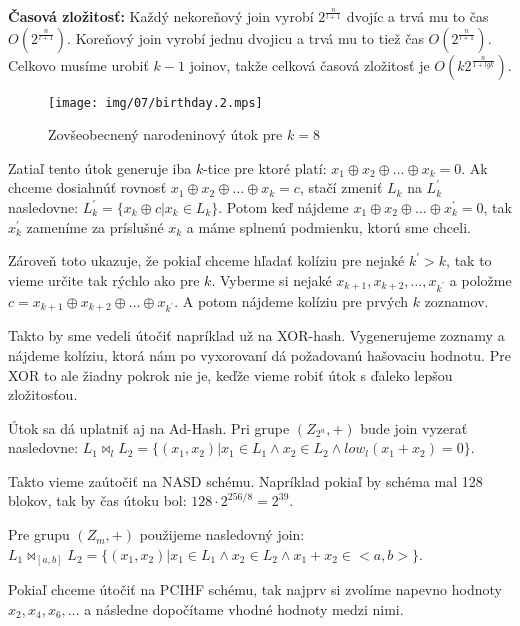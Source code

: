 {\bf Časová zložitosť:} Každý nekoreňový join vyrobí $2^{\frac{n}{l+1}}$ dvojíc a trvá mu to čas $O(2^{\frac{n}{l+1}})$.
Koreňový join vyrobí jednu dvojicu a trvá mu to tiež čas $O(2^{\frac{n}{l+1}})$. Celkovo musíme urobiť $k-1$ joinov, takže
celková časová zložitosť je $O(k 2^{\frac{n}{1+lg k}})$.

\begin{figure}
    \centering
    \texttt{[image: img/07/birthday.2.mps]}
    \caption{Zovšeobecnený narodeninový útok pre $k=8$}
\end{figure}

Zatiaľ tento útok generuje iba $k$-tice pre ktoré platí: $x_1 \oplus x_2 \oplus \dots \oplus x_k = 0$. 
Ak chceme dosiahnúť rovnosť $x_1 \oplus x_2 \oplus \dots \oplus x_k = c$, stačí zmeniť $L_k$ na $L_k^{'}$
nasledovne: $L_k^{'} = \{x_k \oplus c | x_k \in L_k\}$. Potom keď nájdeme $x_1 \oplus x_2 \oplus \dots \oplus x_k^{'} = 0$,
tak $x_k^{'}$ zameníme za príslušné $x_k$ a máme splnenú podmienku, ktorú sme chceli.

Zároveň toto ukazuje, že pokiaľ chceme hľadať kolíziu pre nejaké $k^{'} > k$, tak to vieme
určite tak rýchlo ako pre $k$. Vyberme si nejaké $x_{k+1}, x_{k+2}, \dots, x_{k^{'}}$ a položme
$c = x_{k+1} \oplus x_{k+2} \oplus \dots \oplus x_{k^{'}}$. A potom nájdeme kolíziu pre prvých $k$ zoznamov. 

Takto by sme vedeli útočiť napríklad už na XOR-hash. Vygenerujeme zoznamy a nájdeme kolíziu, ktorá nám po
vyxorovaní dá požadovanú hašovaciu hodnotu. Pre XOR to ale žiadny pokrok nie je, keďže vieme robiť
útok s ďaleko lepšou zložitosťou.

Útok sa dá uplatniť aj na Ad-Hash.
Pri grupe $(Z_{2^n}, +)$ bude join vyzerať nasledovne: $L_1 \bowtie_l L_2 = \{(x_1, x_2) | x_1 \in L_1 \land x_2 \in L_2 \land low_l(x_1 + x_2) = 0\}$.

Takto vieme zaútočiť na NASD schému. Napríklad pokiaľ by schéma mal 128 blokov, tak by čas útoku bol: $128 \cdot 2^{256/8} = 2^{39}$.

Pre grupu $(Z_m, +)$ použijeme nasledovný join: $L_1 \bowtie_{[a,b]} L_2 = \{(x_1, x_2) | x_1 \in L_1 \land x_2 \in L_2 \land x_1 + x_2 \in <a,b>\}$.


Pokiaľ chceme útočiť na PCIHF schému, tak najprv si zvolíme napevno hodnoty $x_2, x_4, x_6, \dots$ a následne dopočítame vhodné hodnoty medzi nimi.

